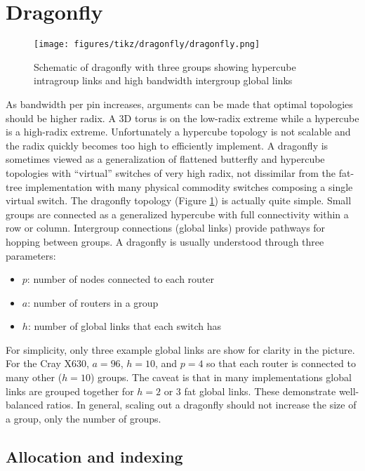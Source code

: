
\section{Dragonfly}
\label{sec:tutorial:dragonfly}

\begin{figure}[h!]
\centering
\texttt{[image: figures/tikz/dragonfly/dragonfly.png]}
\caption{Schematic of dragonfly with three groups showing hypercube intragroup links and high bandwidth intergroup global links}
\label{fig:topologies:dragonfly}
\end{figure}

As bandwidth per pin increases, arguments can be made that optimal topologies should be higher radix.
A 3D torus is on the low-radix extreme while a hypercube is a high-radix extreme.
Unfortunately a hypercube topology is not scalable and the radix quickly becomes too high to efficiently implement.
A dragonfly is sometimes viewed as a generalization of flattened butterfly and hypercube topologies with ``virtual'' switches of very high radix,
not dissimilar from the fat-tree implementation with many physical commodity switches composing a single virtual switch.
The dragonfly topology (Figure \ref{fig:topologies:dragonfly}) is actually quite simple. 
Small groups are connected as a generalized hypercube with full connectivity within a row or column.
Intergroup connections (global links) provide pathways for hopping between groups.
A dragonfly is usually understood through three parameters:
\begin{itemize}
\item $p$: number of nodes connected to each router
\item $a$: number of routers in a group
\item $h$: number of global links that each switch has
\end{itemize}

For simplicity, only three example global links are show for clarity in the picture.
For the Cray X630, $a = 96$, $h=10$, and $p=4$ so that each router is connected to many other ($h=10$) groups.
The caveat is that in many implementations global links are grouped together for $h=2$ or $3$ fat global links.
These demonstrate well-balanced ratios.
In general, scaling out a dragonfly should not increase the size of a group, only the number of groups.

\subsection{Allocation and indexing}
\label{subsec:dragonfly:allocatoin}

